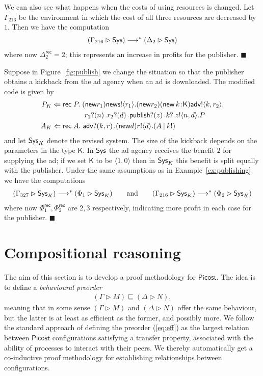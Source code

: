 \documentclass{LMCS}
\newcommand{\pfn}[1]{\mathsf{#1}}  \newcommand{\cfn}[1]{\mathsf{#1}}  \newcommand{\ownfnt}[1]{{\mathsf{#1}}}
\newcommand{\picost}{\ensuremath{\pfn{Picost}}\xspace}
\newcommand{\with}{\mathbin \rhd}
\newcommand{\record}{{\scriptstyle \mathsf{rec}}}
\def\pair(#1,#2){\langle #1 , #2 \rangle}\newcommand{\parrow}{ \mathbin{\rightharpoonup}}
\newcommand{\typeletter}[1]{{\mathsf{#1}}}
\newcommand{\tK}{\typeletter{K}}
\newcommand{\pa}[1]{\!\left(#1\right)}
\newcommand{\pc}[1]{\langle#1\rangle}
\newcommand{\Cassoc}[2]{ {{#1}\kern -0.2em : \kern -0.2em {#2}}}
\newcommand{\Cnew}[2]{(\mathop{\pfn{new}} \Cassoc{#1}{#2})}
\newcommand{\CnewNT}[1]{(\pfn{new} {#1})}
\newcommand{\Cpar}{\mathbin{|}}
\newcommand{\Crec}[2]{\pfn{rec}\;#1.\;#2}
\newcommand{\smalleval}{\longrightarrow}  \newcommand{\csmalleval}[1]{\longrightarrow^{#1}}
\newcommand{\EndDefBox}{\null\hfill$\blacksquare$}
\newcommand{\boxHere}{\global\let\EndProof\empty\EndDefBox}
\begin{document}
\begin{exa}[Publishing]
We can also see what happens when the costs of using resources is changed. 
Let $\Gamma_{216}$ be the environment in which  the cost of all three resources are decreased 
by $1$. Then we have the computation
\begin{align*}
  (\Gamma_{216} \with \Sys)  \smalleval^* (\Delta_2 \with \Sys)
\end{align*}
where now $\Delta_2^\record = 2$; this represents an increase in profits for the publisher. 
\boxHere
\end{exa}

\begin{exa}[Kickbacks]\label{ex:kickback}

Suppose in Figure~\ref{fig:publish} we change the situation so that the publisher obtains a kickback
from the ad agency when an ad is downloaded. The modified code
is given by
\begin{align*}
  P_K         &\Leftarrow \Crec{P}{\CnewNT{r_1} \news!\pc{r_1}. \CnewNT{r_2} \Cnew{k}{\tK} \adv!\pc{k,r_2}. \\
           &\phantom{\Leftarrow  \CnewNT{r_1} }  r_1?\pa{n}. r_2?\pa{d}. \publish?\pa{z}. k?. z!\pc{n,d}. P  }
\\
A_K         &\Leftarrow \Crec{A} {\adv?\pa{k,r}. \CnewNT{d} r!\pc{d}.(A \Cpar k!)}
\end{align*}
and let $\Sys_K$ denote the revised system. The size of the kickback depends on the parameters in the 
type $\tK$. In $\Sys$ the ad agency receives the benefit $2$ for supplying the ad; if we set $\tK$ to be
$\pair(1,0)$ then in $\Sys_K$ this benefit is split equally with the publisher. 
Under the same assumptions as in Example~\ref{ex:publishing} we have the computations
\begin{align*}
  (\Gamma_{327} \with \Sys_K)  \smalleval^* (\Phi_1 \with \Sys_K)\quad\quad\text{and}\qquad
    (\Gamma_{216} \with \Sys_K)  \smalleval^* (\Phi_2 \with \Sys_K)
\end{align*}
where now $\Phi_1^\record, \Phi_2^\record$ are  $2,3$ respectively, indicating more profit in each case
for the publisher. 
\boxHere
\end{exa}
\section{Compositional reasoning}\label{sec:lts}

The aim of this section is to develop a proof methodology 
for \picost. The idea is to define a  \emph{behavioural preorder} 
\begin{align}\label{eq:eff}
(\Gamma \with M) \sqsubseteq (\Delta \with N),  
\end{align}
meaning that in some sense $ (\Gamma \with M) $ and $ (\Delta \with
N)$ offer the same behaviour, but the latter is at least as efficient
as the former, and possibly more.  We follow the standard approach
of defining the preorder (\ref{eq:eff}) as the largest relation
between \picost configurations satisfying a transfer property,
associated with the ability of processes to interact with their
peers. We thereby automatically get a co-inductive proof methodology
for establishing relationships between configurations. 
\end{document}
